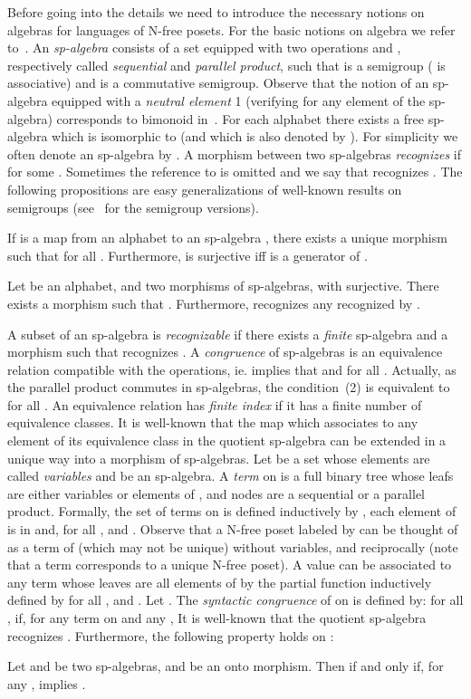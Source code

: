 \documentclass{CSML}
\begin{document}
Before going into the details we need to introduce the necessary notions on algebras for languages of N-free posets.
For the basic notions on algebra we refer to~\cite{Alm94}.
An \emph{sp-algebra}  consists of a set  equipped with two operations  and , respectively called \emph{sequential} and \emph{parallel product}, such that  is a semigroup ( is associative) and  is a commutative semigroup. Observe that the notion of an sp-algebra equipped with a \emph{neutral element} 1 (verifying  for any element  of the sp-algebra) corresponds to bimonoid in~\cite{Bloom199655}. For each alphabet  there exists a free sp-algebra which is isomorphic to  (and which is also denoted by ). 
For simplicity we often denote an sp-algebra  by .
A morphism  between two sp-algebras \emph{recognizes}  if  for some . Sometimes the reference to  is omitted and we say that  recognizes .
The following propositions are easy generalizations of well-known results on semigroups (see~\cite[Prop.~1.8 and 1.9]{Pin84} for the semigroup versions).
\begin{prop}
  If  is a map from an alphabet  to an sp-algebra , there exists a unique morphism  such that  for all . Furthermore,  is surjective iff  is a generator of .
\end{prop}
\begin{prop}
  Let  be an alphabet,  and  two morphisms of sp-algebras, with  surjective. There exists a morphism  such that . Furthermore,  recognizes any  recognized by .
\end{prop}
A subset  of an sp-algebra  is \emph{recognizable} if there exists a \emph{finite} sp-algebra  and a morphism  such that  recognizes . A \emph{congruence}  of sp-algebras is an equivalence relation compatible with the operations, ie.  implies that  and  for all . Actually, as the parallel product commutes in sp-algebras, the condition~(2) is equivalent to  for all . An equivalence relation has \emph{finite index} if it has a finite number of equivalence classes.
It is well-known that the map  which associates to any element of  its equivalence class in the quotient sp-algebra  can be extended in a unique way into a morphism of sp-algebras.
Let  be a set whose elements are called \emph{variables} and  be an sp-algebra. 
A \emph{term} on  is a full binary tree whose leafs are either variables or elements of , and nodes are a sequential or a parallel product.
Formally, the set  of terms on  is defined inductively by , each element of  is in  and, for all ,  and . 
Observe that a N-free poset labeled by  can be thought of as a term of  (which may not be unique) without variables, and reciprocally (note that a term corresponds to a unique N-free poset).
A value can be associated to any term  whose leaves are all elements of  by the partial function  inductively defined by  for all ,  and .
Let . The \emph{syntactic congruence}  of  on  is defined by: for all ,  if, for any term  on  and any , 
It is well-known that the quotient sp-algebra  recognizes . Furthermore, the following property holds on :
\begin{prop}
  \label{prop:synt}
  Let  and  be two sp-algebras,  and  be an onto morphism.
  Then  if and only if, for any ,  implies .
\end{prop}
\end{document}
